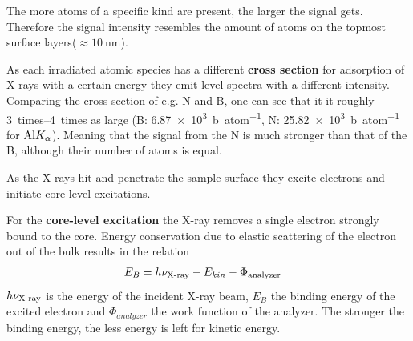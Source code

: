 The more atoms of a specific kind are present, the larger the signal gets. Therefore the signal intensity resembles the amount of atoms on the topmost surface layers($\approx \SI{10}{\nm}$).
	
As each irradiated atomic species has a different \textbf{cross section} for adsorption of X-rays with a certain energy they emit level spectra with a different intensity. Comparing the cross section of e.g. N and B, one can see that it it roughly \SIrange{3}{4}{times} as large (B: \SI{6,87e3}{\barn\per atom}, N: \SI{25,82e3}{\barn\per atom} for $\textnormal{Al} K_{\alpha}$)\cite{henke_x-ray_1993}. Meaning that the signal from the N is much stronger than that of the B, although their number of atoms is equal.

As the X-rays hit and penetrate the sample surface they excite electrons and initiate core-level excitations.

For the \textbf{core-level excitation} the X-ray removes a single electron strongly bound to the core. Energy conservation due to elastic scattering of the electron out of the bulk results in the relation 
\begin{align}
E_B 	&=h\nu_{\textnormal{X-ray}}-E_{kin}-\Phi_{\textnormal{analyzer}}
\end{align}
 $h\nu_{\textnormal{X-ray}}$ is the energy of the incident X-ray beam, $E_B$ the binding energy of the excited electron and $\Phi_{analyzer}$ the work function of the analyzer. The stronger the binding energy, the less energy is left for kinetic energy.
 

